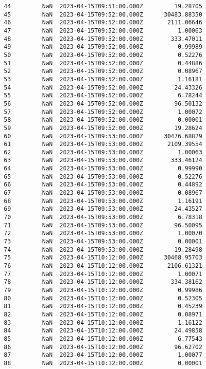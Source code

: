 \documentclass[11pt]{article}
\begin{document}
\begin{tcolorbox}[breakable, size=fbox, boxrule=.5pt, pad at break*=1mm, opacityfill=0]
\begin{Verbatim}[commandchars=\\\{\}]
44         NaN  2023-04-15T09:51:00.000Z         19.28705
45         NaN  2023-04-15T09:52:00.000Z      30483.88350
46         NaN  2023-04-15T09:52:00.000Z       2111.06646
47         NaN  2023-04-15T09:52:00.000Z          1.00063
48         NaN  2023-04-15T09:52:00.000Z        333.47011
49         NaN  2023-04-15T09:52:00.000Z          0.99989
50         NaN  2023-04-15T09:52:00.000Z          0.52276
51         NaN  2023-04-15T09:52:00.000Z          0.44886
52         NaN  2023-04-15T09:52:00.000Z          0.08967
53         NaN  2023-04-15T09:52:00.000Z          1.16181
54         NaN  2023-04-15T09:52:00.000Z         24.43326
55         NaN  2023-04-15T09:52:00.000Z          6.78244
56         NaN  2023-04-15T09:52:00.000Z         96.50132
57         NaN  2023-04-15T09:52:00.000Z          1.00072
58         NaN  2023-04-15T09:52:00.000Z          0.00001
59         NaN  2023-04-15T09:52:00.000Z         19.28624
60         NaN  2023-04-15T09:53:00.000Z      30476.68829
61         NaN  2023-04-15T09:53:00.000Z       2109.39554
62         NaN  2023-04-15T09:53:00.000Z          1.00063
63         NaN  2023-04-15T09:53:00.000Z        333.46124
64         NaN  2023-04-15T09:53:00.000Z          0.99990
65         NaN  2023-04-15T09:53:00.000Z          0.52276
66         NaN  2023-04-15T09:53:00.000Z          0.44892
67         NaN  2023-04-15T09:53:00.000Z          0.08967
68         NaN  2023-04-15T09:53:00.000Z          1.16191
69         NaN  2023-04-15T09:53:00.000Z         24.43527
70         NaN  2023-04-15T09:53:00.000Z          6.78318
71         NaN  2023-04-15T09:53:00.000Z         96.50095
72         NaN  2023-04-15T09:53:00.000Z          1.00070
73         NaN  2023-04-15T09:53:00.000Z          0.00001
74         NaN  2023-04-15T09:53:00.000Z         19.28498
75         NaN  2023-04-15T10:12:00.000Z      30468.95703
76         NaN  2023-04-15T10:12:00.000Z       2106.61321
77         NaN  2023-04-15T10:12:00.000Z          1.00071
78         NaN  2023-04-15T10:12:00.000Z        334.38162
79         NaN  2023-04-15T10:12:00.000Z          0.99986
80         NaN  2023-04-15T10:12:00.000Z          0.52305
81         NaN  2023-04-15T10:12:00.000Z          0.45239
82         NaN  2023-04-15T10:12:00.000Z          0.08971
83         NaN  2023-04-15T10:12:00.000Z          1.16122
84         NaN  2023-04-15T10:12:00.000Z         24.49858
85         NaN  2023-04-15T10:12:00.000Z          6.77543
86         NaN  2023-04-15T10:12:00.000Z         96.62702
87         NaN  2023-04-15T10:12:00.000Z          1.00077
88         NaN  2023-04-15T10:12:00.000Z          0.00001

\end{Verbatim}
\end{tcolorbox}
\end{document}

